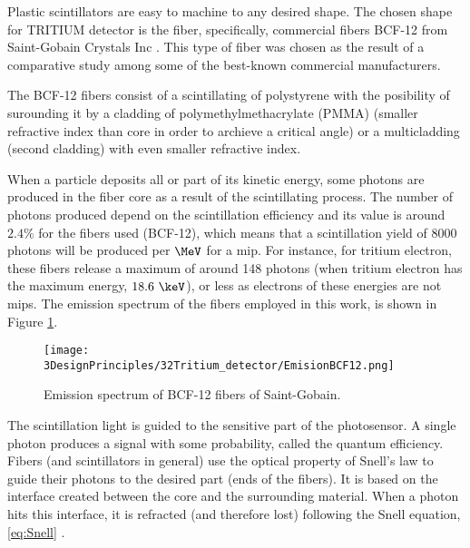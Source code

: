 Plastic scintillators are easy to machine to any desired shape. The chosen shape for TRITIUM detector is the fiber, specifically, commercial fibers BCF-12 from Saint-Gobain Crystals Inc \cite{DataSheetBCF12Fiber}. This type of fiber was chosen as the result of a comparative study \cite{TFGAlberto} among some of the best-known commercial manufacturers. 


The BCF-12 fibers consist of a scintillating of polystyrene with the posibility of surounding it by a cladding of polymethylmethacrylate (PMMA) (smaller refractive index than core in order to archieve a critical angle) or a multicladding (second cladding) with even smaller refractive index.

When a particle deposits all or part of its kinetic energy, some photons are produced in the fiber core as a result of the scintillating process. The number of photons produced depend on the scintillation efficiency and its value is around $2.4\%$ for the fibers used (BCF-12), which means that a scintillation yield of $8000$ photons will be produced per $\MeV$ for a mip. For instance, for tritium electron, these fibers release a maximum of around 148 photons (when tritium electron has the maximum energy, $18.6~\keV$), or less as electrons of these energies are not mips. The emission spectrum of the fibers employed in this work, is shown in Figure \ref{fig:EmissionSpectrumFibers}.

\begin{figure}[htbp]
\centering
\texttt{[image: 3DesignPrinciples/32Tritium\_detector/EmisionBCF12.png]}
\caption{Emission spectrum of BCF-12 fibers of Saint-Gobain.\label{fig:EmissionSpectrumFibers}~\cite{DataSheetBCF12Fiber}}
\end{figure}

The scintillation light is guided to the sensitive part of the photosensor. A single photon produces a signal with some probability, called the quantum efficiency. Fibers (and scintillators in general) use the optical property of Snell's law \cite{Snell} to guide their photons to the desired part (ends of the fibers). It is based on the interface created between the core and the surrounding material. When a photon hits this interface, it is refracted (and therefore lost) following the Snell equation, \ref{eq:Snell} \cite{Snell}. 

